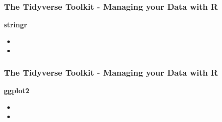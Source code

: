 \begin{frame}
\frametitle{The Tidyverse Toolkit - Managing your Data with R}
\large

\textbf{stringr}
\begin{itemize}
\item


\item 
\end{itemize}
\end{frame}
\begin{frame}
\frametitle{The Tidyverse Toolkit - Managing your Data with R}
\large

\textbf{ggplot2}
\begin{itemize}

\item

\item 

\end{itemize}
\end{frame}
